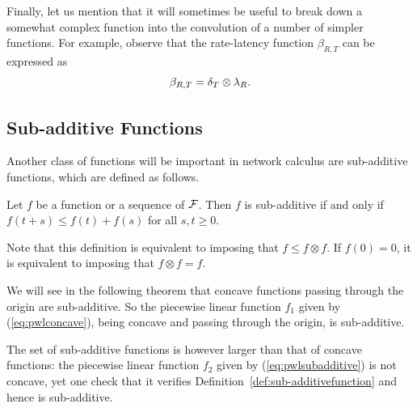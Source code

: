 Finally, let us mention that it will sometimes be useful to break
down a somewhat complex function into the convolution of a number
of simpler functions. For example, observe that the rate-latency
function $\beta_{R,T}$ can be expressed as
\begin{equation}
\mylabel{eq:ratelatencydecomposition}
 \beta_{R,T} = \delta_{T} \otimes \lambda_{R}.
\end{equation}

\subsection{Sub-additive Functions}
Another class of functions will be important in network calculus are sub-additive functions, which
are defined as follows.
\begin{definition}
Let $f$ be a function or a sequence of $\mathcal F$. Then $f$ is sub-additive if and only if $f(t+s) \leq f(t) + f(s)$
for all $s,t \geq 0$.
\end{definition}
Note that this definition is equivalent to imposing that $f \leq f \otimes f$. If $f(0)=0$, it is equivalent
to imposing that $f \otimes f = f$.

We will see in the following theorem that concave functions passing through the origin are sub-additive.
So the piecewise linear function $f_1$ given by (\ref{eq:pwlconcave}), being concave and passing through
the origin, is sub-additive.

The set of sub-additive functions is however larger than that of concave functions:
 the piecewise linear function $f_2$ given by (\ref{eq:pwlsubadditive}) is not concave, yet one check
that it verifies Definition~\ref{def:sub-additivefunction} and hence is sub-additive.

